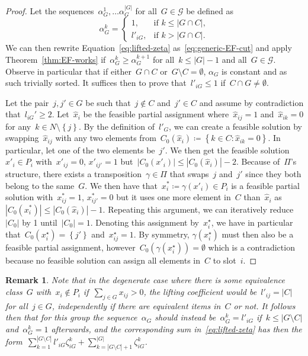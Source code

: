 \documentclass[a4paper,10pt]{article}
\newcommand{\fixed}[1]{\hat{ #1 }}
\newcommand{\lift}{l}
\newcommand{\define}{\coloneqq}
\newcommand{\brackets}[1]{\left\{ #1 \right\}}
\newtheorem{remark}[theorem]{Remark}
\theoremstyle{definition}
\begin{document}
\begin{proof}
  Let the sequences~$\alpha^1_G, \dots \alpha^{|G|}_G$ for all~$G\in\mathcal{G}$ be defined as
  \begin{equation*}
    \alpha^k_G = \begin{cases}
      1, &\text{if } k\leq |G\cap C|, \\
      \lift'_{iG}, &\text{if } k > |G\cap C|.
    \end{cases}
  \end{equation*}
  We can then rewrite Equation~\eqref{eq:lifted-zeta} as~\eqref{eq:generic-EF-cut} and apply Theorem~\ref{thm:EF-works} if~$\alpha^k_G \geq \alpha^{k+1}_G$ for all~$k\leq |G|-1$ and all~$G\in \mathcal{G}$.
  Observe in particular that if either~$G\cap C$ or~$G\setminus C = \emptyset$, $\alpha_G$ is constant and as such trivially sorted.
  It suffices then to prove that~$\lift'_{iG} \leq 1$ if~$C\cap G \neq \emptyset$.
  
  Let the pair~$j, j'\in G$ be such that~$j\notin C$ and~$j'\in C$ and assume by contradiction that~$\lift_{iG}' \geq 2$.
  Let~$\fixed{x}_i$ be the feasible partial assignment where~$\fixed{x}_{ij} = 1$ and~$\fixed{x}_{ik} = 0$ for any~$k\in N\setminus\brackets{j}$.
  By the definition of~$\lift'_G$, we can create a feasible solution by swapping~$\fixed{x}_{ij}$ with any two elements from~$C_0(\fixed{x}_i)\define\brackets{k\in C : \fixed{x}_{ik}= 0}$.
  In particular, let one of the two elements be~$j'$.
  We then get the feasible solution~$x'_i\in P_i$ with~$x'_{ij} = 0$, $x'_{ij'} = 1$ but~$\left|C_0(x'_i)\right| \leq \left|C_0(\fixed{x}_i)\right|-2$. 
  Because of~$\Pi$'s structure, there exists a transposition~$\gamma\in\Pi$ that swaps~$j$ and~$j'$ since they both belong to the same~$G$.
  We then have that~$x^*_i\define \gamma(x'_i)\in P_i$ is a feasible partial solution with~$x^*_{ij} =1$, $x^*_{ij'} = 0$ but it uses one more element in~$C$ than~$\fixed{x}_i$ as~$|C_0(x^*_i)| \leq |C_0(\fixed{x}_i)| - 1$.
  Repeating this argument, we can iteratively reduce~$|C_0|$ by 1 until~$|C_0| =1$.
  Denoting this assignment by~$x^\star_i$, we have in particular that~$C_0(x^\star_i) = \brackets{j'}$ and~$x^\star_{ij} = 1$.
  By symmetry, $\gamma(x^\star_i)$ must then also be a feasible partial assignment, however~$C_0(\gamma(x^\star_i)) = \emptyset$ which is a contradiction because no feasible solution can assign all elements in~$C$ to slot~$i$.
\end{proof}
%
\begin{remark}
  Note that in the degenerate case where there is some equivalence class~$G$ with~$x_{i}\notin P_i$ if~$\sum_{j\in G} x_{ij} > 0$, the lifting coefficient would be~$\lift'_{ij} = |C|$ for all~$j\in G$, independently if there are equivalent items in~$C$ or not.
  It follows then that for this group the sequence~$\alpha_G$ should instead be~$\alpha^k_G = \lift'_{iG}$ if~$k\leq |G\setminus C|$ and~$\alpha^k_G = 1$ afterwards, and the corresponding sum in~\eqref{eq:lifted-zeta} has then the form~$\sum_{k=1}^{|G\setminus C|} \lift'_{iG} \zeta^k_{iG} +\sum_{k = |G\setminus C| + 1}^{|G|} \zeta^k_{iG}$.

\end{remark}
\end{document}
